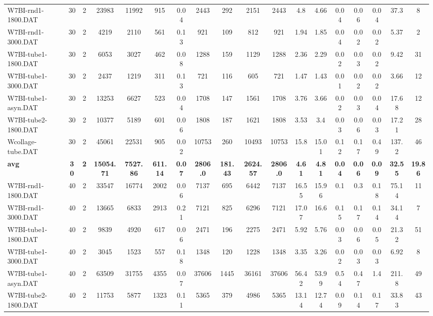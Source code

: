 \begin{sidewaystable}[h]
{\begin{tabular}{lccccccccccccccccc}
W7BI-rnd1-1800.DAT & 30 & 2 & 23983 & 11992 & 915 & 0.04 & 2443 & 292 & 2151 & 2443 & 4.8 & 4.66 & 0.04 & 0.06 & 0.04 & 37.3 & 8\\
W7BI-rnd1-3000.DAT & 30 & 2 & 4219 & 2110 & 561 & 0.13 & 921 & 109 & 812 & 921 & 1.94 & 1.85 & 0.04 & 0.02 & 0.02 & 5.37 & 2\\
W7BI-tube1-1800.DAT & 30 & 2 & 6053 & 3027 & 462 & 0.08 & 1288 & 159 & 1129 & 1288 & 2.36 & 2.29 & 0.02 & 0.03 & 0.02 & 9.42 & 31\\
W7BI-tube1-3000.DAT & 30 & 2 & 2437 & 1219 & 311 & 0.13 & 721 & 116 & 605 & 721 & 1.47 & 1.43 & 0.01 & 0.02 & 0.02 & 3.66 & 12\\
W7BI-tube1-asyn.DAT & 30 & 2 & 13253 & 6627 & 523 & 0.04 & 1708 & 147 & 1561 & 1708 & 3.76 & 3.66 & 0.02 & 0.03 & 0.04 & 17.68 & 12\\
W7BI-tube2-1800.DAT & 30 & 2 & 10377 & 5189 & 601 & 0.06 & 1808 & 187 & 1621 & 1808 & 3.53 & 3.4 & 0.03 & 0.06 & 0.03 & 17.21 & 28\\
Wcollage-tube.DAT & 30 & 2 & 45061 & 22531 & 905 & 0.02 & 10753 & 260 & 10493 & 10753 & 15.8 & 15.01 & 0.12 & 0.17 & 0.49 & 137.2 & 46\\
\cline{1-18} \textbf{avg} & \textbf{30} & \textbf{2} & \textbf{15054.71} & \textbf{7527.86} & \textbf{611.14} & \textbf{0.07} & \textbf{2806.0} & \textbf{181.43} & \textbf{2624.57} & \textbf{2806.0} & \textbf{4.61} & \textbf{4.81} & \textbf{0.04} & \textbf{0.06} & \textbf{0.09} & \textbf{32.55} & \textbf{19.86} \\ \cline{1-18}
W7BI-rnd1-1800.DAT & 40 & 2 & 33547 & 16774 & 2002 & 0.06 & 7137 & 695 & 6442 & 7137 & 16.55 & 15.96 & 0.1 & 0.3 & 0.18 & 75.14 & 11\\
W7BI-rnd1-3000.DAT & 40 & 2 & 13665 & 6833 & 2913 & 0.21 & 7121 & 825 & 6296 & 7121 & 17.07 & 16.6 & 0.15 & 0.17 & 0.14 & 34.14 & 7\\
W7BI-tube1-1800.DAT & 40 & 2 & 9839 & 4920 & 617 & 0.06 & 2471 & 196 & 2275 & 2471 & 5.92 & 5.76 & 0.03 & 0.06 & 0.05 & 21.32 & 51\\
W7BI-tube1-3000.DAT & 40 & 2 & 3045 & 1523 & 557 & 0.18 & 1348 & 120 & 1228 & 1348 & 3.35 & 3.26 & 0.02 & 0.03 & 0.03 & 6.92 & 8\\
W7BI-tube1-asyn.DAT & 40 & 2 & 63509 & 31755 & 4355 & 0.07 & 37606 & 1445 & 36161 & 37606 & 56.42 & 53.99 & 0.54 & 0.47 & 1.4 & 211.8 & 49\\
W7BI-tube2-1800.DAT & 40 & 2 & 11753 & 5877 & 1323 & 0.11 & 5365 & 379 & 4986 & 5365 & 13.14 & 12.74 & 0.09 & 0.14 & 0.17 & 33.83 & 43\\

\end{tabular}}
\end{sidewaystable}
